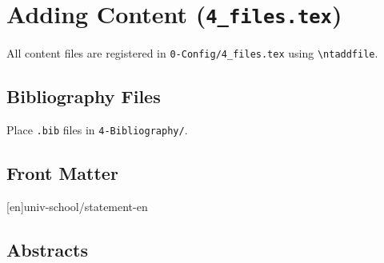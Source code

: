 \section{Adding Content (\texttt{4\_files.tex})}
\label{sec:adding_content}

All content files are registered in \verb!0-Config/4_files.tex! using
\verb!\ntaddfile!.

\subsection{Bibliography Files}
\label{sub:bib_files}

\begin{latexcode}
\end{latexcode}

Place \verb!.bib! files in \verb!4-Bibliography/!.

\subsection{Front Matter}
\label{sub:front_matter}

\begin{latexcode}

[en]{univ-school/statement-en}
\end{latexcode}

\subsection{Abstracts}
\label{sub:abstracts}

